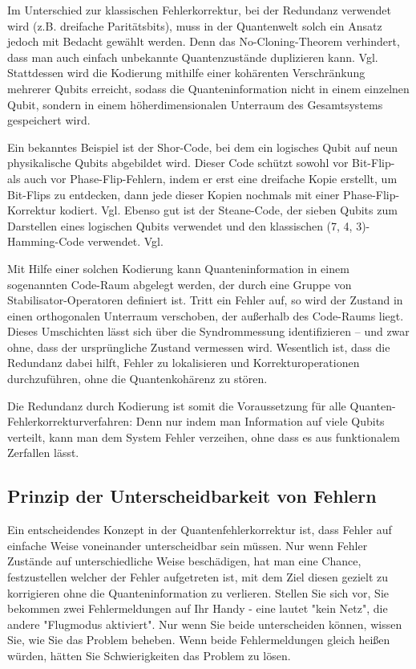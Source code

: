 Im Unterschied zur klassischen Fehlerkorrektur, bei der Redundanz verwendet wird (z.B. dreifache Paritätsbits), muss in der Quantenwelt solch ein Ansatz jedoch mit Bedacht gewählt werden. Denn das No-Cloning-Theorem verhindert, dass man auch einfach unbekannte Quantenzustände duplizieren kann. Vgl. \cite{nielsen_quantum_2010} Stattdessen wird die Kodierung mithilfe einer kohärenten Verschränkung mehrerer Qubits erreicht, sodass die Quanteninformation nicht in einem einzelnen Qubit, sondern in einem höherdimensionalen Unterraum des Gesamtsystems gespeichert wird.

Ein bekanntes Beispiel ist der Shor-Code, bei dem ein logisches Qubit auf neun physikalische Qubits abgebildet wird. Dieser Code schützt sowohl vor Bit-Flip- als auch vor Phase-Flip-Fehlern, indem er erst eine dreifache Kopie erstellt, um Bit-Flips zu entdecken, dann jede dieser Kopien nochmals mit einer Phase-Flip-Korrektur kodiert. Vgl. \cite{shor_scheme_1995}
Ebenso gut ist der Steane-Code, der sieben Qubits zum Darstellen eines logischen Qubits verwendet und den klassischen (7, 4, 3)-Hamming-Code verwendet. Vgl. \cite{steane_error_1996}

Mit Hilfe einer solchen Kodierung kann Quanteninformation in einem sogenannten Code-Raum abgelegt werden, der durch eine Gruppe von Stabilisator-Operatoren definiert ist. Tritt ein Fehler auf, so wird der Zustand in einen orthogonalen Unterraum verschoben, der außerhalb des Code-Raums liegt. Dieses Umschichten lässt sich über die Syndrommessung identifizieren – und zwar ohne, dass der ursprüngliche Zustand vermessen wird. Wesentlich ist, dass die Redundanz dabei hilft, Fehler zu lokalisieren und Korrekturoperationen durchzuführen, ohne die Quantenkohärenz zu stören.

Die Redundanz durch Kodierung ist somit die Voraussetzung für alle Quanten-Fehlerkorrekturverfahren: Denn nur indem man Information auf viele Qubits verteilt, kann man dem System Fehler verzeihen, ohne dass es aus funktionalem Zerfallen lässt.

\subsection{Prinzip der Unterscheidbarkeit von Fehlern}
Ein entscheidendes Konzept in der Quantenfehlerkorrektur ist, dass Fehler auf einfache Weise voneinander unterscheidbar sein müssen. Nur wenn Fehler Zustände auf unterschiedliche Weise beschädigen, hat man eine Chance, festzustellen welcher der Fehler aufgetreten ist, mit dem Ziel diesen gezielt zu korrigieren ohne die Quanteninformation zu verlieren. Stellen Sie sich vor, Sie bekommen zwei Fehlermeldungen auf Ihr Handy - eine lautet "kein Netz", die andere "Flugmodus aktiviert". Nur wenn Sie beide unterscheiden können, wissen Sie, wie Sie das Problem beheben. Wenn beide Fehlermeldungen gleich heißen würden, hätten Sie Schwierigkeiten das Problem zu lösen. 

